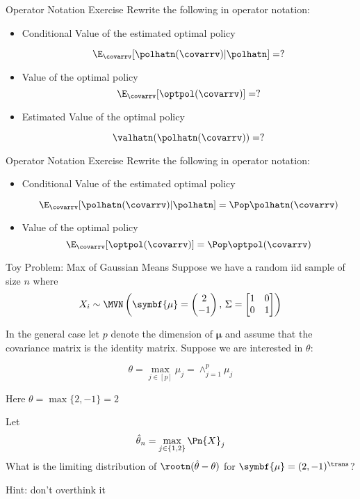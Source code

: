 \documentclass[aspectratio=169, professionalfonts]{beamer}
\begin{document}
\begin{frame}{Operator Notation Exercise}
	Rewrite the following in operator notation:
	\vfill
	\begin{itemize}

		\item Conditional Value of the estimated optimal policy

		      $$\E_{\covarrv}[\polhatn(\covarrv) \vert \polhatn] = ?$$

		\item Value of the optimal policy
		      $$\E_{\covarrv}[\optpol(\covarrv)] = ?$$

		\item Estimated Value of the optimal policy

		      $$\valhatn(\polhatn(\covarrv)) = ?$$
	\end{itemize}
	\vfill

\end{frame}


\begin{frame}{Operator Notation Exercise}
	Rewrite the following in operator notation:
	\vfill
	\begin{itemize}

		\item Conditional Value of the estimated optimal policy

		      $$\E_{\covarrv}[\polhatn(\covarrv) \vert \polhatn] = \Pop \polhatn(\covarrv)$$

		\item Value of the optimal policy
		      $$\E_{\covarrv}[\optpol(\covarrv)] = \Pop \optpol(\covarrv)$$
	\end{itemize}
	\vfill

\end{frame}

\begin{frame}{Toy Problem: Max of Gaussian Means}
	Suppose we have a random iid sample of size $n$ where
	\begin{equation*}
		X_i \sim \MVN \left(\symbf{\mu} = \begin{pmatrix}2 \\ -1 \end{pmatrix},\, \Sigma = \begin{bmatrix}1 & 0
               \\ 0 & 1\end{bmatrix} \right)
	\end{equation*}

	\vfill
	\pause

	In the general case let $p$ denote the dimension of $\symbf{\mu}$ and assume that
	the covariance matrix is the identity matrix. Suppose we are interested in $\theta$:

	$$\theta = \max_{j \in
			[p]} \mu_j = \displaystyle \land_{j = 1}^{p} \mu_j$$
	\vfill

	Here $\theta = \max \{2, -1\} = 2$

	\vfill
	\pause
	Let $$\hat{\theta}_n = \max_{j \in \{1, 2 \}} \Pn {X}_j $$
	\vfill
	\pause
	What is the limiting distribution of $\rootn (\hat{\theta} - \theta)$ for $\symbf{\mu} =
		(2, -1 )^{\trans}$?

	Hint: don't overthink it
\end{frame}
\end{document}
